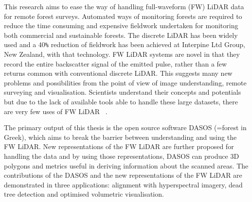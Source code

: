 \documentclass{subfiles}
\begin{document}
\par This research aims to ease the way of handling full-waveform (FW) LiDAR  data for remote forest surveys. Automated ways of monitoring forests are required to reduce the time consuming and expensive fieldwork undertaken for monitoring both commercial and sustainable forests. The discrete LiDAR has been widely used and a 40\verb|%| reduction of fieldwork has been achieved at Interpine Ltd Group, New Zealand, with that technology. FW LiDAR systems are novel in that they record the entire backscatter signal of the emitted pulse, rather than a few returns common with conventional discrete LiDAR. This suggests many new problems and possibilities from the point of view of image understanding, remote surveying and visualisation. Scientists understand their concepts and potentials but due to the lack of available tools able to handle these large datasets, there are very few uses of FW LiDAR ~\cite{Anderson2015}.

\par The primary output of this thesis is the open source software DASOS (=forest in Greek), which aims to break the barrier between understanding and using the FW LiDAR. New representations of the FW LiDAR are further proposed for handling the data and by using those representations, DASOS can produce 3D polygons and metrics useful in deriving information about the scanned areas. The contributions of the DASOS and the new representations of the FW LiDAR are demonstrated in three applications: alignment with hyperspectral imagery, dead tree detection and optimised volumetric visualisation.
\end{document}
